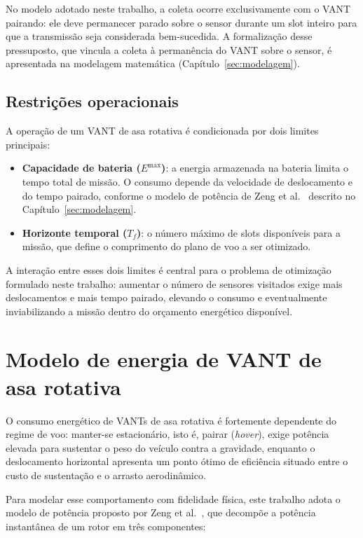 No modelo adotado neste trabalho, a coleta ocorre exclusivamente com o VANT pairando: ele deve permanecer parado sobre o sensor durante um slot inteiro para que a transmissão seja considerada bem-sucedida. A formalização desse pressuposto, que vincula a coleta à permanência do VANT sobre o sensor, é apresentada na modelagem matemática (Capítulo~\ref{sec:modelagem}).

\subsection{Restrições operacionais}

A operação de um VANT de asa rotativa é condicionada por dois limites principais:

\begin{itemize}
    \item \textbf{Capacidade de bateria ($E^{\max}$)}: a energia armazenada na bateria limita o tempo total de missão. O consumo depende da velocidade de deslocamento e do tempo pairado, conforme o modelo de potência de Zeng et al.~\cite{zeng2019rotarywing} descrito no Capítulo~\ref{sec:modelagem}.
    \item \textbf{Horizonte temporal ($T_f$)}: o número máximo de slots disponíveis para a missão, que define o comprimento do plano de voo a ser otimizado.
\end{itemize}

A interação entre esses dois limites é central para o problema de otimização formulado neste trabalho: aumentar o número de sensores visitados exige mais deslocamentos e mais tempo pairado, elevando o consumo e eventualmente inviabilizando a missão dentro do orçamento energético disponível.

\section{Modelo de energia de VANT de asa rotativa}
\label{sec:modelo-energia}

O consumo energético de VANTs de asa rotativa é fortemente dependente do regime de voo: manter-se estacionário, isto é, pairar (\emph{hover}), exige potência elevada para sustentar o peso do veículo contra a gravidade, enquanto o deslocamento horizontal apresenta um ponto ótimo de eficiência situado entre o custo de sustentação e o arrasto aerodinâmico.

Para modelar esse comportamento com fidelidade física, este trabalho adota o modelo de potência proposto por Zeng et al.~\cite{zeng2019rotarywing}, que decompõe a potência instantânea de um rotor em três componentes:

